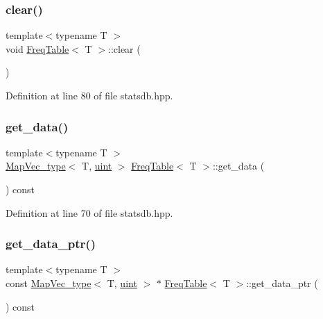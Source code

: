 \subsubsection{\texorpdfstring{clear()}{clear()}}
{\footnotesize\ttfamily template$<$typename T $>$ \\
void \hyperlink{class_freq_table}{Freq\+Table}$<$ T $>$\+::clear (\begin{DoxyParamCaption}{ }\end{DoxyParamCaption})\hspace{0.3cm}{\ttfamily [inline]}}



Definition at line 80 of file statsdb.\+hpp.

\mbox{\label{class_freq_table_a7b99496d1c2f4193654752856b30d1a5}} 
\subsubsection{\texorpdfstring{get\+\_\+data()}{get\_data()}}
{\footnotesize\ttfamily template$<$typename T $>$ \\
\hyperlink{typedefs_8hpp_a02ed8dec96bc528c8bc3d8cb3c4674a5}{Map\+Vec\+\_\+type}$<$ T, \hyperlink{typedefs_8hpp_a91ad9478d81a7aaf2593e8d9c3d06a14}{uint} $>$ \hyperlink{class_freq_table}{Freq\+Table}$<$ T $>$\+::get\+\_\+data (\begin{DoxyParamCaption}{ }\end{DoxyParamCaption}) const\hspace{0.3cm}{\ttfamily [inline]}}



Definition at line 70 of file statsdb.\+hpp.

\mbox{\label{class_freq_table_ab5dd6677f52072c93d18b2b9a3369ae7}} 
\subsubsection{\texorpdfstring{get\+\_\+data\+\_\+ptr()}{get\_data\_ptr()}}
{\footnotesize\ttfamily template$<$typename T $>$ \\
const \hyperlink{typedefs_8hpp_a02ed8dec96bc528c8bc3d8cb3c4674a5}{Map\+Vec\+\_\+type}$<$ T, \hyperlink{typedefs_8hpp_a91ad9478d81a7aaf2593e8d9c3d06a14}{uint} $>$ $\ast$ \hyperlink{class_freq_table}{Freq\+Table}$<$ T $>$\+::get\+\_\+data\+\_\+ptr (\begin{DoxyParamCaption}{ }\end{DoxyParamCaption}) const\hspace{0.3cm}{\ttfamily [inline]}}



